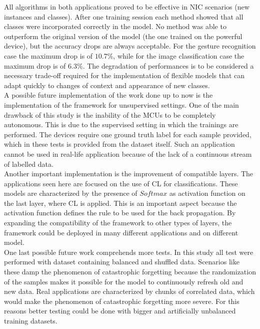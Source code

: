 \documentclass[12pt]{report}
\begin{document}
All algorithms in both applications proved to be effective in NIC scenarios (new instances and classes). After one training session each method showed that all classes were incorporated correctly in the model. No method was able to outperform the original version of the model (the one trained on the powerful device), but the accuracy drops are always acceptable. For the gesture recognition case the maximum drop is of $10.7 \%$, while for the image classification case the maximum drop is of $6.3 \%$. The degradation of performances is to be considered a necessary trade-off required for the implementation of flexible models that can adapt quickly to changes of context and appearance of new classes.\\

A possible future implementation of the work done up to now is the implementation of the framework for unsupervised settings. One of the main drawback of this study is the inability of the MCUs to be completely autonomous. This is due to the supervised setting in which the trainings are performed. The devices require one ground truth label for each sample provided, which in these tests is provided from the dataset itself. Such an application cannot be used in real-life application because of the lack of a continuous stream of labelled data.\\
Another important implementation is the improvement of compatible layers. The applications seen here are focused on the use of CL for classifications. These models are characterized by the presence of $Softmax$ as activation function on the last layer, where CL is applied. This is an important aspect because the activation function defines the rule to be used for the back propagation. By expanding the compatibility of the framework to other types of layers, the framework could be deployed in many different applications and on different model.\\
One last possible future work comprehends more tests. In this study all test were performed with dataset containing balanced and shuffled data. Scenarios like these damp the phenomenon of catastrophic forgetting because the randomization of the samples makes it possible for the model to continuously refresh old and new data. Real applications are characterized by chunks of correlated data, which would make the phenomenon of catastrophic forgetting more severe. For this reasons better testing could be done with bigger and artificially unbalanced training datasets.


\printbibliography
\end{document}
